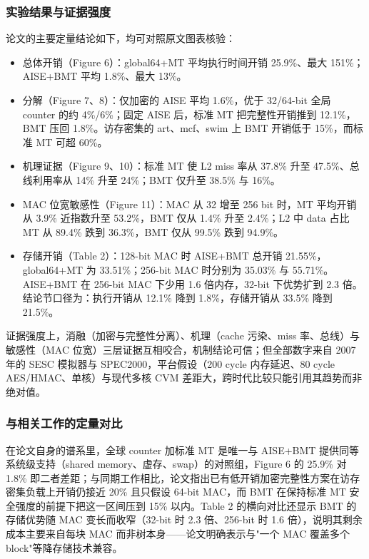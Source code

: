 \documentclass[11pt]{ctexart}
\begin{document}
\subsubsection{实验结果与证据强度}
论文的主要定量结论如下，均可对照原文图表核验：\par
\begin{itemize}
\item 总体开销（Figure 6）：global64+MT 平均执行时间开销 25.9\%、最大 151\%；AISE+BMT 平均 1.8\%、最大 13\%。
\item 分解（Figure 7、8）：仅加密的 AISE 平均 1.6\%，优于 32/64-bit 全局 counter 的约 4\%/6\%；固定 AISE 后，标准 MT 把完整性开销推到 12.1\%，BMT 压回 1.8\%。访存密集的 art、mcf、swim 上 BMT 开销低于 15\%，而标准 MT 可超 60\%。
\item 机理证据（Figure 9、10）：标准 MT 使 L2 miss 率从 37.8\% 升至 47.5\%、总线利用率从 14\% 升至 24\%；BMT 仅升至 38.5\% 与 16\%。
\item MAC 位宽敏感性（Figure 11）：MAC 从 32 增至 256 bit 时，MT 平均开销从 3.9\% 近指数升至 53.2\%，BMT 仅从 1.4\% 升至 2.4\%；L2 中 data 占比 MT 从 89.4\% 跌到 36.3\%，BMT 仅从 99.5\% 跌到 94.9\%。
\item 存储开销（Table 2）：128-bit MAC 时 AISE+BMT 总开销 21.55\%，global64+MT 为 33.51\%；256-bit MAC 时分别为 35.03\% 与 55.71\%。AISE+BMT 在 256-bit MAC 下少用 1.6 倍内存，32-bit 下优势扩到 2.3 倍。结论节口径为：执行开销从 12.1\% 降到 1.8\%，存储开销从 33.5\% 降到 21.5\%。
\end{itemize}
证据强度上，消融（加密与完整性分离）、机理（cache 污染、miss 率、总线）与敏感性（MAC 位宽）三层证据互相咬合，机制结论可信；但全部数字来自 2007 年的 SESC 模拟器与 SPEC2000，平台假设（200 cycle 内存延迟、80 cycle AES/HMAC、单核）与现代多核 CVM 差距大，跨时代比较只能引用其趋势而非绝对值。\par
\subsubsection{与相关工作的定量对比}
在论文自身的谱系里，全球 counter 加标准 MT 是唯一与 AISE+BMT 提供同等系统级支持（shared memory、虚存、swap）的对照组，Figure 6 的 25.9\% 对 1.8\% 即二者差距；与同期工作相比，论文指出已有低开销加密完整性方案在访存密集负载上开销仍接近 20\% 且只假设 64-bit MAC，而 BMT 在保持标准 MT 安全强度的前提下把这一区间压到 15\% 以内。Table 2 的横向对比还显示 BMT 的存储优势随 MAC 变长而收窄（32-bit 时 2.3 倍、256-bit 时 1.6 倍），说明其剩余成本主要来自每块 MAC 而非树本身——论文明确表示与"一个 MAC 覆盖多个 block"等降存储技术兼容。\par
\end{document}
